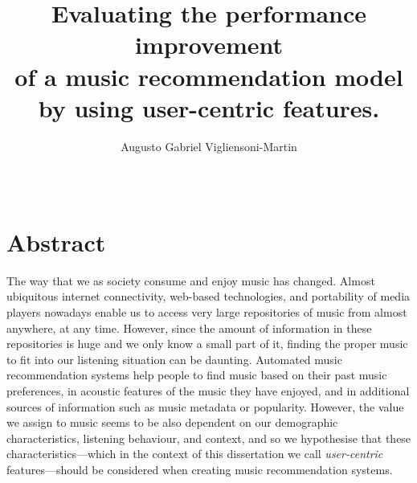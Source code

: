\documentclass[12pt,letterpaper]{report}
\begin{document}
\title{
\vspace{-1cm}
Evaluating the performance improvement\\
 of a music recommendation model\\
  by using user-centric features.}




\author{Augusto Gabriel Vigliensoni-Martin}
\date{\Month\ \number\year}

\maketitle

\raggedbottom
\doublespacing



\section*{\centering Abstract}

The way that we as society consume and enjoy music has changed. Almost ubiquitous internet connectivity, web-based technologies, and portability of media players nowadays enable us to access very large repositories of music from almost anywhere, at any time.
However, since the amount of information in these repositories is huge and we only know a small part of it, finding the proper music to fit into our listening situation can be daunting.
Automated music recommendation systems help people to find music based on their past music preferences, in acoustic features of the music they have enjoyed, and in additional sources of information such as music metadata or popularity.
However, the value we assign to music seems to be also dependent on our demographic characteristics, listening behaviour, and context, and so we hypothesise that these characteristics---which in the context of this dissertation we call \textit{user-centric} features---should be considered when creating music recommendation systems.
\end{document}
